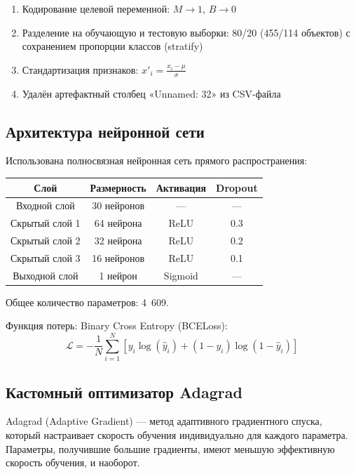 \begin{enumerate}
    \item Кодирование целевой переменной: $M \to 1$, $B \to 0$
    \item Разделение на обучающую и тестовую выборки: 80/20 (455/114 объектов)
          с сохранением пропорции классов (stratify)
    \item Стандартизация признаков: $x'_i = \frac{x_i - \mu}{\sigma}$
    \item Удалён артефактный столбец «Unnamed: 32» из CSV-файла
\end{enumerate}

\subsection{Архитектура нейронной сети}

Использована полносвязная нейронная сеть прямого распространения:

\begin{center}
\begin{tabular}{cccc}
    \toprule
    \textbf{Слой} & \textbf{Размерность} & \textbf{Активация} & \textbf{Dropout} \\
    \midrule
    Входной слой       & 30 нейронов     & ---              & ---   \\
    Скрытый слой 1     & 64 нейрона      & ReLU             & 0.3   \\
    Скрытый слой 2     & 32 нейрона      & ReLU             & 0.2   \\
    Скрытый слой 3     & 16 нейронов     & ReLU             & 0.1   \\
    Выходной слой      & 1 нейрон        & Sigmoid          & ---   \\
    \bottomrule
\end{tabular}
\end{center}

Общее количество параметров: 4~609.

Функция потерь: Binary Cross Entropy (BCELoss):
$$
\mathcal{L} = -\frac{1}{N} \sum_{i=1}^{N} \left[y_i \log(\hat{y}_i) + (1 - y_i) \log(1 - \hat{y}_i)\right]
$$

\subsection{Кастомный оптимизатор Adagrad}

Adagrad (Adaptive Gradient) — метод адаптивного градиентного спуска,
который настраивает скорость обучения индивидуально для каждого параметра.
Параметры, получившие большие градиенты, имеют меньшую эффективную скорость
обучения, и наоборот.

